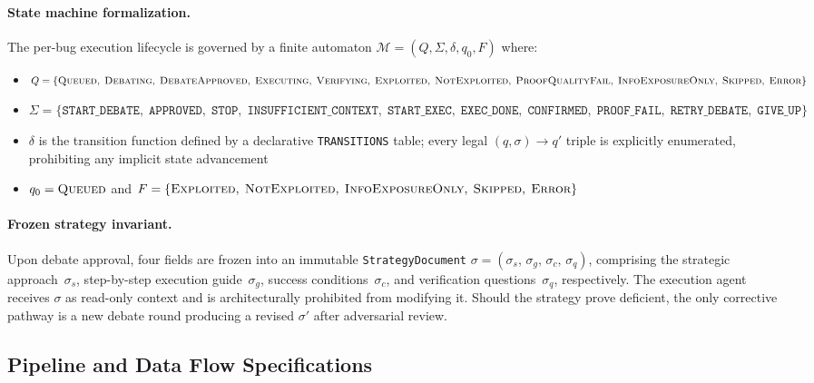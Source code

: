 \paragraph{State machine formalization.}
The per-bug execution lifecycle is governed by a finite automaton
$\mathcal{M} = (Q, \Sigma, \delta, q_0, F)$ where:
\begin{itemize}
  \item $Q = \{\textsc{Queued},\; \textsc{Debating},\;
    \textsc{DebateApproved},\; \textsc{Executing},\;
    \textsc{Verifying},\; \textsc{Exploited},\;
    \textsc{NotExploited},\; \textsc{ProofQualityFail},\;
    \textsc{InfoExposureOnly},\; \textsc{Skipped},\;
    \textsc{Error}\}$
  \item $\Sigma = \{\texttt{START\_DEBATE},\; \texttt{APPROVED},\;
    \texttt{STOP},\; \texttt{INSUFFICIENT\_CONTEXT},\;
    \texttt{START\_EXEC},\; \texttt{EXEC\_DONE},\;
    \texttt{CONFIRMED},\; \texttt{PROOF\_FAIL},\;
    \texttt{RETRY\_DEBATE},\; \texttt{GIVE\_UP}\}$
  \item $\delta$ is the transition function defined by a declarative
    \texttt{TRANSITIONS} table; every legal $(q, \sigma) \to q'$ triple
    is explicitly enumerated, prohibiting any implicit state advancement
  \item $q_0 = \textsc{Queued}$ and
    $F = \{\textsc{Exploited},\; \textsc{NotExploited},\;
    \textsc{InfoExposureOnly},\; \textsc{Skipped},\; \textsc{Error}\}$
\end{itemize}

\paragraph{Frozen strategy invariant.}
Upon debate approval, four fields are frozen into an immutable
\texttt{StrategyDocument}
$\sigma = (\sigma_s,\, \sigma_g,\, \sigma_c,\, \sigma_q)$,
comprising the strategic approach~$\sigma_s$, step-by-step execution
guide~$\sigma_g$, success conditions~$\sigma_c$, and verification
questions~$\sigma_q$, respectively.
The execution agent receives $\sigma$ as read-only context and is
architecturally prohibited from modifying it.
Should the strategy prove deficient, the only corrective pathway is a
new debate round producing a revised $\sigma'$ after adversarial review.

\subsection{Pipeline and Data Flow Specifications}
\label{subsec:pipeline}

